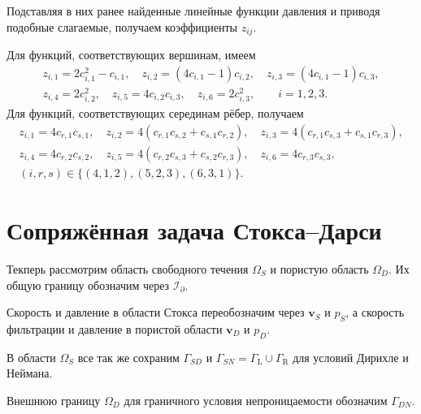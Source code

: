 \documentclass[a4paper,14pt]{extarticle}
\begin{document}
Подставляя в них ранее найденные линейные функции давления
и приводя подобные слагаемые, получаем коэффициенты $z_{ij}$.


Для функций, соответствующих вершинам, имеем
\begin{equation}
	\begin{gathered}
		z_{i,1}=2c_{i,1}^2-c_{i,1},
		\quad
		z_{i,2}=(4c_{i,1}-1)c_{i,2},
		\quad
		z_{i,3}=(4c_{i,1}-1)c_{i,3},
		\\[6pt]
		z_{i,4}=2c_{i,2}^2,
		\quad
		z_{i,5}=4c_{i,2}c_{i,3},
		\quad
		z_{i,6}=2c_{i,3}^2,
		\qquad i=1,2,3.
	\end{gathered}
\end{equation}
Для функций, соответствующих серединам рёбер, получаем
\begin{equation}
	\begin{gathered}
		z_{i,1}=4c_{r,1}c_{s,1},
		\quad
		z_{i,2}=4\left(c_{r,1}c_{s,2}+c_{s,1}c_{r,2}\right),
		\quad
		z_{i,3}=4\left(c_{r,1}c_{s,3}+c_{s,1}c_{r,3}\right),
		\\[6pt]
		z_{i,4}=4c_{r,2}c_{s,2},
		\quad
		z_{i,5}=4\left(c_{r,2}c_{s,3}+c_{s,2}c_{r,3}\right),
		\quad
		z_{i,6}=4c_{r,3}c_{s,3},
		\\[6pt]
		(i,r,s)\in
		\{(4,1,2),(5,2,3),(6,3,1)\}.
	\end{gathered}
\end{equation}



\newpage
\section{Сопряжённая задача Стокса--Дарси}

Текперь рассмотрим область свободного течения $\Omega_S$ и
пористую область $\Omega_D$. Их общую границу обозначим
через $\mathcal I_{\partial}$.

Скорость и давление в области Стокса переобозначим через
$\mathbf v_S$ и $p_S$, а скорость фильтрации и давление
в пористой области  $\mathbf v_D$ и $p_D$.


В области $\Omega_S$ все так же сохраним
$\Gamma_{SD}$ и $\Gamma_{SN} = \Gamma_{\mathrm L}\cup\Gamma_{\mathrm R}$ для условий Дирихле и Неймана. 

Внешнюю границу $\Omega_D$ для граничного условия непроницаемости обозначим $\Gamma_{DN}$.
\end{document}
